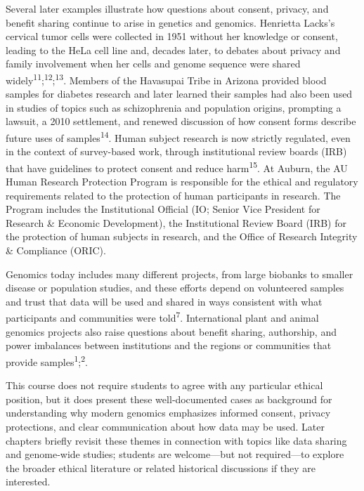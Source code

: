 \documentclass[
  letterpaper,
  DIV=11,
  numbers=noendperiod]{scrreprt}
\begin{document}
Several later examples illustrate how questions about consent, privacy,
and benefit sharing continue to arise in genetics and genomics.
Henrietta Lacks's cervical tumor cells were collected in 1951 without
her knowledge or consent, leading to the HeLa cell line and, decades
later, to debates about privacy and family involvement when her cells
and genome sequence were shared
widely\textsuperscript{11};\textsuperscript{12};\textsuperscript{13}.
Members of the Havasupai Tribe in Arizona provided blood samples for
diabetes research and later learned their samples had also been used in
studies of topics such as schizophrenia and population origins,
prompting a lawsuit, a 2010 settlement, and renewed discussion of how
consent forms describe future uses of samples\textsuperscript{14}. Human
subject research is now strictly regulated, even in the context of
survey-based work, through institutional review boards (IRB) that have
guidelines to protect consent and reduce harm\textsuperscript{15}. At
Auburn, the AU Human Research Protection Program is responsible for the
ethical and regulatory requirements related to the protection of human
participants in research. The Program includes the Institutional
Official (IO; Senior Vice President for Research \& Economic
Development), the Institutional Review Board (IRB) for the protection of
human subjects in research, and the Office of Research Integrity \&
Compliance (ORIC).

Genomics today includes many different projects, from large biobanks to
smaller disease or population studies, and these efforts depend on
volunteered samples and trust that data will be used and shared in ways
consistent with what participants and communities were
told\textsuperscript{7}. International plant and animal genomics
projects also raise questions about benefit sharing, authorship, and
power imbalances between institutions and the regions or communities
that provide samples\textsuperscript{1};\textsuperscript{2}.

This course does not require students to agree with any particular
ethical position, but it does present these well‑documented cases as
background for understanding why modern genomics emphasizes informed
consent, privacy protections, and clear communication about how data may
be used. Later chapters briefly revisit these themes in connection with
topics like data sharing and genome‑wide studies; students are
welcome---but not required---to explore the broader ethical literature
or related historical discussions if they are interested.
\end{document}
